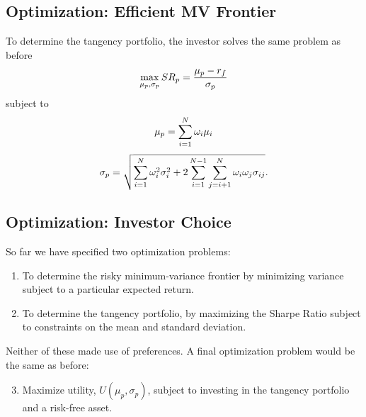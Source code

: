 \documentclass[letterpaper,10pt,english]{sphinxmanual}
\begin{document}
\subsection{Optimization: Efficient MV Frontier}
\label{multiAssetOpt:optimization-efficient-mv-frontier}
To determine the tangency portfolio, the investor solves the same
problem as before
\begin{gather}
\begin{split}\max_{\mu_p, \sigma_p} SR_p = \frac{\mu_p - r_f}{\sigma_p}\end{split}\notag
\end{gather}
subject to
\begin{gather}
\begin{split}\mu_p = \sum_{i=1}^N \omega_i \mu_i\end{split}\notag
\end{gather}\begin{gather}
\begin{split}\sigma_p = \sqrt{\sum_{i=1}^N \omega^2_i \sigma^2_i + 2
\sum_{i=1}^{N-1} \sum_{j=i+1}^N \omega_i \omega_j \sigma_{ij}}.\end{split}\notag
\end{gather}

\subsection{Optimization: Investor Choice}
\label{multiAssetOpt:optimization-investor-choice}
So far we have specified two optimization problems:
\begin{enumerate}
\item {} 
To determine the risky minimum-variance frontier by minimizing
variance subject to a particular expected return.

\end{enumerate}
\begin{enumerate}
\setcounter{enumi}{1}
\item {} 
To determine the tangency portfolio, by maximizing the Sharpe
Ratio subject to constraints on the mean and standard
deviation.

\end{enumerate}

Neither of these made use of preferences.  A final optimization
problem would be the same as before:
\begin{enumerate}
\setcounter{enumi}{2}
\item {} 
Maximize utility, $U(\mu_p, \sigma_p)$, subject to investing
in the tangency portfolio and a risk-free asset.

\end{enumerate}
\end{document}
